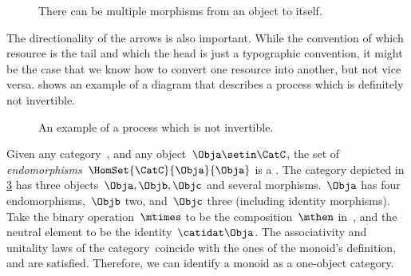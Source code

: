 \begin{figure}[h!]
    \centering
    \caption{There can be multiple morphisms from an object to itself.}
    \label{fig:e8}
\end{figure}

The directionality of the arrows is also important.
While the convention of which resource is the tail and which the head is just a typographic convention, it might be the case that we know how to convert one resource into another, but not vice versa.
 shows an example of a diagram that describes a process which is definitely not invertible.

\begin{figure}[h!]
    \centering
    \caption{An example of a process which is not invertible. }
    \label{fig:e10}
\end{figure}

\begin{example}
    Given any category~\CatC, and any object~$\Obja\setin \CatC$, the set of \emph{endomorphisms}~$\HomSet{\CatC}{\Obja}{\Obja}$ is a .
    The category depicted in \cref{fig:monoid_endomorphisms} has three objects~$\Obja,\Objb,\Objc$ and several morphisms.~$\Obja$ has four endomorphisms,~$\Objb$ two, and~$\Objc$ three (including identity morphisms).
    Take the binary operation~$\mtimes$ to be the composition~$\mthen$ in~\CatC, and the neutral element to be the identity~$\catidat\Obja$.
    The associativity and unitality laws of the category~\CatC coincide with the ones of the monoid's definition, and are satisfied.
    Therefore, we can identify a monoid as a one-object category.
\end{example}

\begin{figure}[h!]
    \centering
    \caption{}
    \label{fig:monoid_endomorphisms}
\end{figure}

